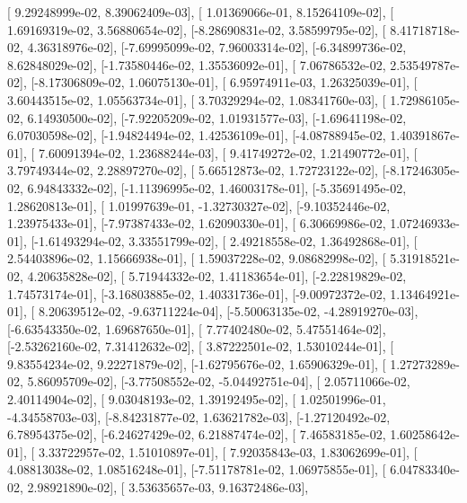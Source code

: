 \documentclass{article}
\begin{document}
       [ 9.29248999e-02,  8.39062409e-03],
       [ 1.01369066e-01,  8.15264109e-02],
       [ 1.69169319e-02,  3.56880654e-02],
       [-8.28690831e-02,  3.58599795e-02],
       [ 8.41718718e-02,  4.36318976e-02],
       [-7.69995099e-02,  7.96003314e-02],
       [-6.34899736e-02,  8.62848029e-02],
       [-1.73580446e-02,  1.35536092e-01],
       [ 7.06786532e-02,  2.53549787e-02],
       [-8.17306809e-02,  1.06075130e-01],
       [ 6.95974911e-03,  1.26325039e-01],
       [ 3.60443515e-02,  1.05563734e-01],
       [ 3.70329294e-02,  1.08341760e-03],
       [ 1.72986105e-02,  6.14930500e-02],
       [-7.92205209e-02,  1.01931577e-03],
       [-1.69641198e-02,  6.07030598e-02],
       [-1.94824494e-02,  1.42536109e-01],
       [-4.08788945e-02,  1.40391867e-01],
       [ 7.60091394e-02,  1.23688244e-03],
       [ 9.41749272e-02,  1.21490772e-01],
       [ 3.79749344e-02,  2.28897270e-02],
       [ 5.66512873e-02,  1.72723122e-02],
       [-8.17246305e-02,  6.94843332e-02],
       [-1.11396995e-02,  1.46003178e-01],
       [-5.35691495e-02,  1.28620813e-01],
       [ 1.01997639e-01, -1.32730327e-02],
       [-9.10352446e-02,  1.23975433e-01],
       [-7.97387433e-02,  1.62090330e-01],
       [ 6.30669986e-02,  1.07246933e-01],
       [-1.61493294e-02,  3.33551799e-02],
       [ 2.49218558e-02,  1.36492868e-01],
       [ 2.54403896e-02,  1.15666938e-01],
       [ 1.59037228e-02,  9.08682998e-02],
       [ 5.31918521e-02,  4.20635828e-02],
       [ 5.71944332e-02,  1.41183654e-01],
       [-2.22819829e-02,  1.74573174e-01],
       [-3.16803885e-02,  1.40331736e-01],
       [-9.00972372e-02,  1.13464921e-01],
       [ 8.20639512e-02, -9.63711224e-04],
       [-5.50063135e-02, -4.28919270e-03],
       [-6.63543350e-02,  1.69687650e-01],
       [ 7.77402480e-02,  5.47551464e-02],
       [-2.53262160e-02,  7.31412632e-02],
       [ 3.87222501e-02,  1.53010244e-01],
       [ 9.83554234e-02,  9.22271879e-02],
       [-1.62795676e-02,  1.65906329e-01],
       [ 1.27273289e-02,  5.86095709e-02],
       [-3.77508552e-02, -5.04492751e-04],
       [ 2.05711066e-02,  2.40114904e-02],
       [ 9.03048193e-02,  1.39192495e-02],
       [ 1.02501996e-01, -4.34558703e-03],
       [-8.84231877e-02,  1.63621782e-03],
       [-1.27120492e-02,  6.78954375e-02],
       [-6.24627429e-02,  6.21887474e-02],
       [ 7.46583185e-02,  1.60258642e-01],
       [ 3.33722957e-02,  1.51010897e-01],
       [ 7.92035843e-03,  1.83062699e-01],
       [ 4.08813038e-02,  1.08516248e-01],
       [-7.51178781e-02,  1.06975855e-01],
       [ 6.04783340e-02,  2.98921890e-02],
       [ 3.53635657e-03,  9.16372486e-03],
\end{document}
